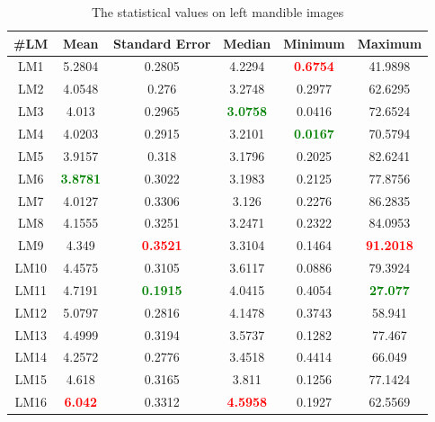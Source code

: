 \documentclass[review]{elsarticle}
\begin{document}
\begin{table}[htbp]
	\begin{tabular}{ | c | c | c | c | c | c | }
\hline
	 \textbf{\#LM} & \textbf{Mean} & \textbf{Standard Error} & \textbf{Median} & \textbf{Minimum} & \textbf{Maximum} \\ \hline
	LM1 & 5.2804 & 0.2805 & 4.2294 & \textcolor{red}{\textbf{0.6754}} & 41.9898 \\ \hline
	LM2 & 4.0548 & 0.276 & 3.2748 & 0.2977 & 62.6295 \\ \hline
	LM3 & 4.013 & 0.2965 & \textcolor{green}{\textbf{3.0758}} & 0.0416 & 72.6524 \\ \hline
	LM4 & 4.0203 & 0.2915 & 3.2101 & \textcolor{green}{\textbf{0.0167}} & 70.5794 \\ \hline
	LM5 & 3.9157 & 0.318 & 3.1796 & 0.2025 & 82.6241 \\ \hline
	LM6 & \textcolor{green}{\textbf{3.8781}} & 0.3022 & 3.1983 & 0.2125 & 77.8756 \\ \hline
	LM7 & 4.0127 & 0.3306 & 3.126 & 0.2276 & 86.2835 \\ \hline
	LM8 & 4.1555 & 0.3251 & 3.2471 & 0.2322 & 84.0953 \\ \hline
	LM9 & 4.349 & \textcolor{red}{\textbf{0.3521}} & 3.3104 & 0.1464 & \textcolor{red}{\textbf{91.2018}} \\ \hline
	LM10 & 4.4575 & 0.3105 & 3.6117 & 0.0886 & 79.3924 \\ \hline
	LM11 & 4.7191 & \textcolor{green}{\textbf{0.1915}} & 4.0415 & 0.4054 & \textcolor{green}{\textbf{27.077}} \\ \hline
	LM12 & 5.0797 & 0.2816 & 4.1478 & 0.3743 & 58.941 \\ \hline
	LM13 & 4.4999 & 0.3194 & 3.5737 & 0.1282 & 77.467 \\ \hline
	LM14 & 4.2572 & 0.2776 & 3.4518 & 0.4414 & 66.049 \\ \hline
	LM15 & 4.618 & 0.3165 & 3.811 & 0.1256 & 77.1424 \\ \hline
	LM16 & \textcolor{red}{\textbf{6.042}} & 0.3312 & \textcolor{red}{\textbf{4.5958}} & 0.1927 & 62.5569 \\ \hline
\end{tabular}
\caption{The statistical values on left mandible images}
\label{a4}
\end{table}
\end{document}
